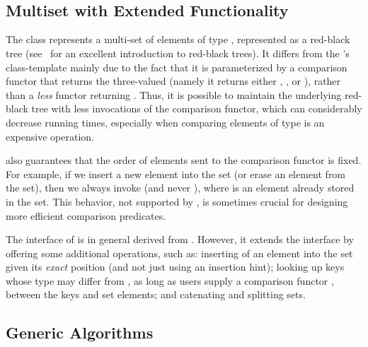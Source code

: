 \\
\\

\subsection*{Multiset with Extended Functionality}

The class  represents a
multi-set of elements of type , represented as a red-black tree
(see~\cite[Chapter~13]{clrs-ia-01} for an excellent introduction to red-black
trees). It differs from the \stl's  class-template mainly due
to the fact that it is parameterized by a comparison functor 
that returns the three-valued  (namely it returns
either , , or ), rather than a {\em less}
functor returning . Thus, it is possible to maintain
the underlying red-black tree with less invocations of the comparison functor,
which can considerably decrease running times, especially when comparing
elements of type  is an expensive operation.

 also guarantees that the order of
elements sent to the comparison functor is fixed. For example, if we insert
a new element  into the set (or erase an element from the set), then
we always invoke  (and never ),
where  is an element already stored in the set. This behavior, not
supported by , is sometimes crucial for designing more
efficient comparison predicates.

The interface of  is in general
derived from . However, it extends the interface by
offering some additional operations, such as: inserting of an element into
the set given its {\em exact} position (and not just using an insertion hint);
looking up keys whose type may differ from , as long as users supply
a comparison functor , between the keys and set elements;
and catenating and splitting sets.



\subsection*{Generic Algorithms}

